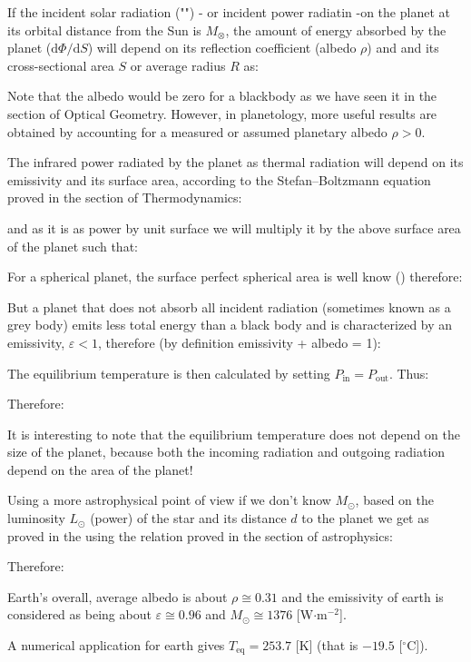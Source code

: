 	If the incident solar radiation ("") - or incident power radiatin -on the planet at its orbital distance from the Sun is $M_\otimes$, the amount of energy absorbed by the planet ($\mathrm{d}\Phi/\mathrm{d}S$) will depend on its reflection coefficient (albedo $\rho$) and and its cross-sectional area $S$ or average radius $R$ as:
	
	Note that the albedo would be zero for a blackbody as we have seen it in the section of Optical Geometry. However, in planetology, more useful results are obtained by accounting for a measured or assumed planetary albedo $\rho>0$.

	The infrared power radiated by the planet as thermal radiation will depend on its emissivity and its surface area, according to the Stefan–Boltzmann equation proved in the section of Thermodynamics:
	
	and as it is as power by unit surface we will multiply it by the above surface area of the planet such that:
	
	 For a spherical planet, the surface perfect spherical area is well know () therefore:
	
	But a planet that does not absorb all incident radiation (sometimes known as a grey body) emits less total energy than a black body and is characterized by an emissivity, $\varepsilon< 1$, therefore (by definition emissivity + albedo = 1):
	
	The equilibrium temperature is then calculated by setting $P_\text{in}=P_\text{out}$. Thus:
	
	Therefore:
	
	It is interesting to note that the equilibrium temperature does not depend on the size of the planet, because both the incoming radiation and outgoing radiation depend on the area of the planet!
	
	Using a more astrophysical point of view if we don't know $M_\odot$, based on the luminosity $L_\odot$ (power) of the star and its distance $d$ to the planet we get as proved in the using the relation proved in the section of astrophysics:
	
	Therefore:
	
	
	Earth's overall, average albedo is about $\rho\cong 0.31$ and the emissivity of earth is considered as being about $\varepsilon\cong 0.96$ and $M_\odot\cong 1376$ [W$\cdot$m$^{-2}$].

	A numerical application for earth gives $T_\text{eq}=253.7$ [K] (that is $-19.5$ [$^\circ$C]).

